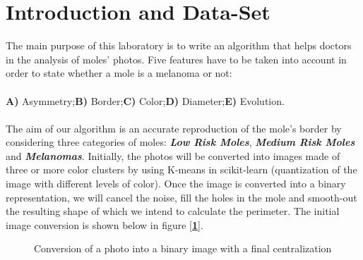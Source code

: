 \documentclass[12pt]{report}
\begin{document}
\section{Introduction and Data-Set}

The main purpose of this laboratory is to write an algorithm that helps doctors in the analysis of moles' photos. Five features have to be taken into account in order to state whether a mole is a melanoma or not:\\ \\ \textbf{A)} Asymmetry;\qquad \textbf{B)} Border;\qquad \textbf{C)} Color;\qquad \textbf{D)} Diameter;\qquad \textbf{E)} Evolution.\\ \\The aim of our algorithm is an accurate reproduction of the mole's border by considering three categories of moles: \textit{\textbf{Low Risk Moles}}, \textit{\textbf{Medium Risk Moles}} and \textit{\textbf{Melanomas}}. Initially, the photos will be converted into images made of three or more color clusters by using K-means in scikit-learn (quantization of the image with different levels of color). Once the image is converted into a binary representation, we will cancel the noise, fill the holes in the mole and smooth-out the resulting shape of which we intend to calculate the perimeter.  The initial image conversion is shown below in figure [\textbf{\ref{fig:dataset1}}].
 
\begin{figure}[H]
\centering
{}
\qquad
{}
\qquad
{}
\caption{Conversion of a photo into a binary image with a final centralization}
\label{fig:dataset1} 
\end{figure}
\end{document}
